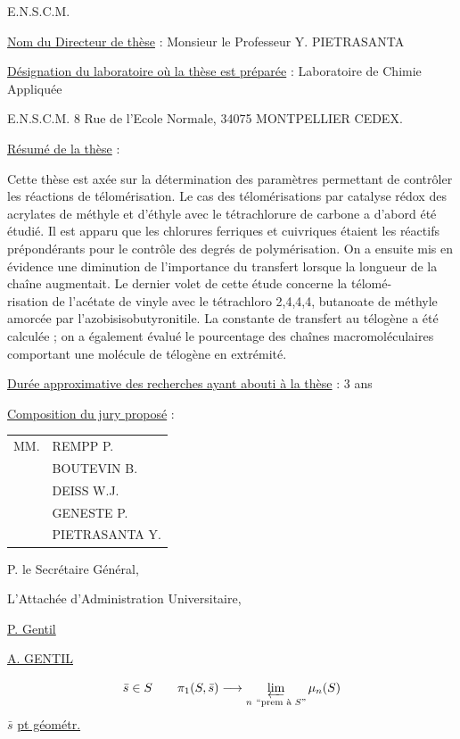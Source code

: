 E.N.S.C.M.

\uline{Nom du Directeur de thèse} : Monsieur le Professeur Y. PIETRASANTA

\uline{Désignation du laboratoire où la thèse est préparée} : Laboratoire de Chimie Appliquée

E.N.S.C.M. 8 Rue de l'Ecole Normale, 34075 MONTPELLIER CEDEX.

\uline{Résumé de la thèse} :

Cette thèse est axée sur la détermination des paramètres permettant de contrôler les réactions de télomérisation. Le cas des télomérisations par catalyse rédox des acrylates de méthyle et d'éthyle avec le tétrachlorure de carbone a d'abord été étudié. Il est apparu que les chlorures ferriques et cuivriques étaient les réactifs prépondérants pour le contrôle des degrés de polymérisation. On a ensuite mis en évidence une diminution de l'importance du transfert lorsque la longueur de la chaîne augmentait. Le dernier volet de cette étude concerne la télomé-\\
risation de l'acétate de vinyle avec le tétrachloro 2,4,4,4, butanoate de méthyle amorcée par l'azobisisobutyronitile. La constante de transfert au télogène a été calculée ; on a également évalué le pourcentage des chaînes macromoléculaires comportant une molécule de télogène en extrémité.

\uline{Durée approximative des recherches ayant abouti à la thèse} : 3 ans

\uline{Composition du jury proposé} :
\begin{tabular}{ll}
MM.&REMPP P.\\
& BOUTEVIN B.\\
& DEISS W.J.\\
& GENESTE P.\\
& PIETRASANTA Y.
\end{tabular}

P. le Secrétaire Général,

L'Attachée d'Administration Universitaire,

\uline{P. Gentil}

\uline{A. GENTIL}

\[
\bar s\in S\qquad
\pi_1(S,\bar s)\longrightarrow
\varprojlim_{n\ \text{``prem à }S\text{''}}\mu_n(S)
\]
$\bar s$ \uline{pt géométr.}


